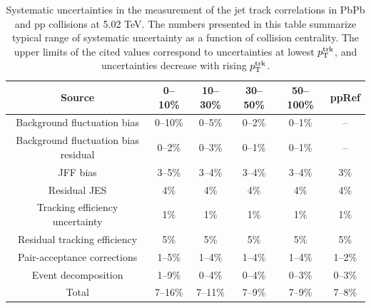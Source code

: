 \begin{table}[htbp]
\begin{center}
	
\caption[Systematic uncertainties for particle density correlation studies at 5.02 TeV]{Systematic uncertainties in the measurement of the jet track correlations in PbPb and pp collisions at 5.02 TeV. The numbers presented in this table summarize typical range of systematic uncertainty as a function of collision centrality.  The upper limits of the cited values correspond to uncertainties at lowest $p_{\rm T}^{\rm trk}$, and uncertainties decrease with rising $p_{\rm T}^{\rm trk}$.}

\begin{tabular}{c|ccccc}
\hline
\hline
Source & 0--10\% &  10--30\% & 30--50\%& 50--100\% & ppRef \\ 
\hline
Background fluctuation bias              & 0--10\%    & 0--5\%  &        0--2\%  &       0--1\% & -- \\
Background fluctuation bias residual      & 0--2\% &       0--3\% &     0--1\% &     0--1\%&       --\\
JFF bias                                         & 3--5\%      & 3--4\% &        3--4\%&       3--4\%    &    3\% \\
Residual JES                                   & 4\% &       4\% &               4\% &            4\% &          4\% \\  
Tracking efficiency uncertainty          & 1\% &             1\%&         1\%&           1\% &        1\%  \\
Residual tracking efficiency              &    5\% &                5\%&      5\%&            5\% &         5\% \\
Pair-acceptance corrections              & 1--5\% &      1--4\% &     1--4\% &       1--4\% &       1--2\% \\
Event decomposition                     & 1--9\% &       0--4\% &     0--4\% &     0--3\%&       0--3\% \\
\hline
Total                                        & 7--16\%     & 7--11\%     & 7--9\%  & 7--9\% &        7--8\% \\
\hline
\hline
\end{tabular}
\label{tab:sys2}
\end{center}
\end{table}





